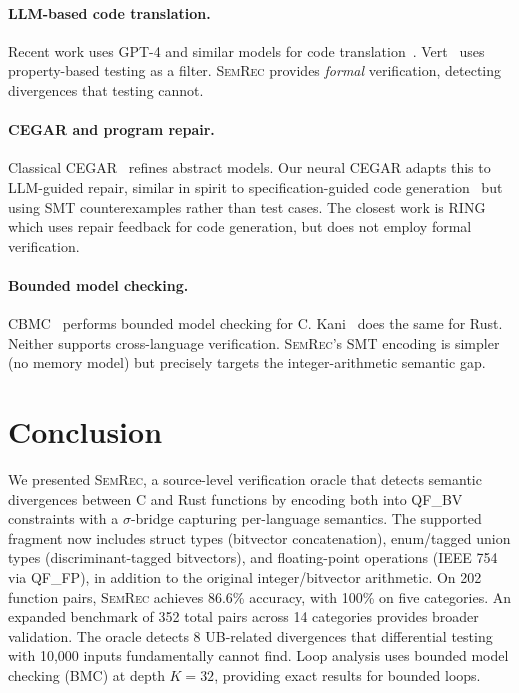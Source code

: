 \documentclass[11pt]{article}
\newcommand{\semrec}{\textsc{SemRec}}
\newcommand{\sigbridge}{$\sigma$-bridge}
\newcommand{\qfbv}{\textsf{QF\_BV}}
\begin{document}
\paragraph{LLM-based code translation.}
Recent work uses GPT-4 and similar models for code
translation~\cite{pan2024lost,yang2024vert}.
Vert~\cite{yang2024vert} uses property-based testing as a filter.
\semrec{} provides \emph{formal} verification, detecting divergences
that testing cannot.

\paragraph{CEGAR and program repair.}
Classical CEGAR~\cite{cegar} refines abstract models.  Our neural CEGAR
adapts this to LLM-guided repair, similar in spirit to
specification-guided code generation~\cite{jain2024livecodebench} but using
SMT counterexamples rather than test cases.  The closest work is
RING~\cite{ring2024} which uses repair feedback for code generation, but does
not employ formal verification.

\paragraph{Bounded model checking.}
CBMC~\cite{cbmc} performs bounded model checking for C.
Kani~\cite{kani} does the same for Rust.  Neither supports cross-language
verification.  \semrec{}'s SMT encoding is simpler (no memory model) but
precisely targets the integer-arithmetic semantic gap.

\section{Conclusion}\label{sec:conclusion}

We presented \semrec{}, a source-level verification oracle that detects
semantic divergences between C and Rust functions by encoding both into
\qfbv{} constraints with a \sigbridge{} capturing per-language semantics.
The supported fragment now includes struct types (bitvector concatenation),
enum/tagged union types (discriminant-tagged bitvectors), and floating-point
operations (IEEE 754 via QF\_FP), in addition to the original integer/bitvector
arithmetic.  On 202 function pairs, \semrec{} achieves 86.6\% accuracy,
with 100\% on five categories.  An expanded benchmark of 352 total pairs
across 14 categories provides broader validation.  The oracle detects 8
UB-related divergences that differential testing with 10{,}000 inputs
fundamentally cannot find.  Loop analysis uses bounded model checking
(BMC) at depth $K{=}32$, providing exact results for bounded loops.
\end{document}
